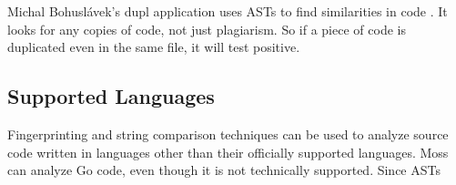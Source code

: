 \documentclass[12pt]{article}
\begin{document}
				Michal Bohuslávek's dupl application uses ASTs to find similarities in code \cite{bohuslave}. It looks for any copies of code, not just plagiarism. So if a piece of code is duplicated even in the same file, it will test positive.
			
				\begin{figure}
					\begin{floatrow}
							
					\end{floatrow}
				\end{figure}
		
		\subsection{Supported Languages}
			Fingerprinting and string comparison techniques can be used to analyze source code written in languages other than their officially supported languages. Moss can analyze Go code, even though it is not technically supported. Since ASTs 
\end{document}

